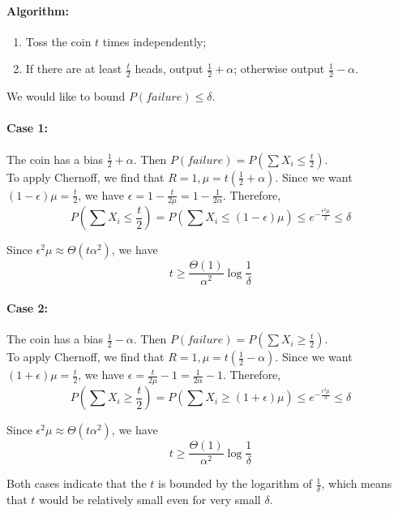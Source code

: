\documentclass[11pt]{article}
\begin{document}
\paragraph{Algorithm:}

\begin{enumerate}
	\item Toss the coin $t$ times independently;
	\item If there are at least $\frac{t}{2}$ heads, output $\frac{1}{2}+\alpha$; otherwise output $\frac{1}{2}-\alpha$.
\end{enumerate}

We would like to bound $P(failure) \le \delta$. \\

\paragraph{Case 1:}
The coin has a bias $\frac{1}{2}+\alpha$. Then $P(failure) = P(\sum X_i \le \frac{t}{2})$. \\

To apply Chernoff, we find that $R=1, \mu=t(\frac{1}{2}+\alpha)$. Since we want $(1-\epsilon)\mu = \frac{t}{2}$, we have $\epsilon = 1-\frac{t}{2\mu} = 1-\frac{1}{2\alpha}$. Therefore,
\[
	P(\sum X_i \le \frac{t}{2}) = P(\sum X_i \le (1-\epsilon)\mu) \le e^{-\frac{\epsilon^2\mu}{2}} \le \delta
\]

Since $\epsilon^2\mu \approx \Theta(t \alpha^2)$, we have 
\[
	t \ge \frac{\Theta(1)}{\alpha^2}\log \frac{1}{\delta}
\]

\paragraph{Case 2:}

The coin has a bias $\frac{1}{2}-\alpha$. Then $P(failure) = P(\sum X_i \ge \frac{t}{2})$. \\

To apply Chernoff, we find that $R=1, \mu=t(\frac{1}{2}-\alpha)$. Since we want $(1+\epsilon)\mu = \frac{t}{2}$, we have $\epsilon = \frac{t}{2\mu}-1 = \frac{1}{2\alpha}-1$. Therefore,
\[
	P(\sum X_i \ge \frac{t}{2}) = P(\sum X_i \ge (1+\epsilon)\mu) \le e^{-\frac{\epsilon^2\mu}{3}} \le \delta
\]

Since $\epsilon^2\mu \approx \Theta(t \alpha^2)$, we have 
\[
	t \ge \frac{\Theta(1)}{\alpha^2}\log \frac{1}{\delta}
\]

Both cases indicate that the $t$ is bounded by the logarithm of $\frac{1}{\delta}$, which means that $t$ would be relatively small even for very small $\delta$.
\end{document}
